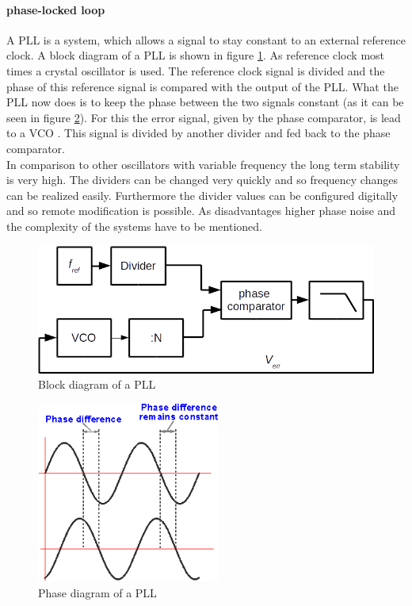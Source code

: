\paragraph{phase-locked loop\\}
A PLL is a system, which allows a signal to stay constant to an external reference clock. A block diagram of a PLL is shown in figure \ref{fig:pllblocks}. As reference clock most times a crystal oscillator is used. The reference clock signal is divided and the phase of this reference signal is compared with the output of the PLL. What the PLL now does is to keep the phase between the two signals constant (as it can be seen in figure \ref{fig:pllphase}). For this the error signal, given by the phase comparator, is lead to a VCO . This signal is divided by another divider and fed back to the phase comparator.\\
In comparison to other oscillators with variable frequency the long term stability is very high. The dividers can be changed very quickly and so frequency changes can be realized easily. Furthermore the divider values can be configured digitally and so remote modification is possible. As disadvantages higher phase noise and the complexity of the systems have to be mentioned.
\begin{figure}[htbp]
\begin{center}
\includegraphics[width=12cm,keepaspectratio=true]{bilder/png/PLLblocks}
\caption{Block diagram of a PLL}
\label{fig:pllblocks}
\end{center}
\end{figure}
\begin{figure}[htbp]
\begin{center}
\includegraphics[width=6cm,keepaspectratio=true]{bilder/png/PLLphase}
\caption{Phase diagram of a PLL}
\label{fig:pllphase}
\end{center}
\end{figure}
